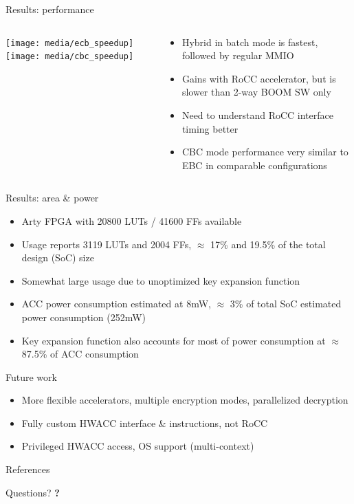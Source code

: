 \documentclass[dvipsnames]{beamer}
\begin{document}
\begin{frame}{Results: performance}
  \begin{columns}[T]
  \begin{column}{0.5\textwidth}
  \texttt{[image: media/ecb\_speedup]}
  \texttt{[image: media/cbc\_speedup]}
  \end{column}
  \begin{column}{0.5\textwidth}
  \begin{itemize}
    \item Hybrid in batch mode is fastest, followed by regular MMIO
    \item Gains with RoCC accelerator, but is slower than 2-way BOOM SW only
    \item Need to understand RoCC interface timing better
    \item CBC mode performance very similar to EBC in comparable configurations
  \end{itemize}
  \end{column}
  \end{columns}
\end{frame}

\begin{frame}{Results: area \& power}
  \begin{itemize}
  \item Arty FPGA with 20800 LUTs / 41600 FFs available
  \item Usage reports 3119 LUTs and 2004 FFs, $\approx$ 17\% and 19.5\% of the
    total design (SoC) size
  \item Somewhat large usage due to unoptimized key expansion function
  \item ACC power consumption estimated at 8mW, $\approx$ 3\% of total SoC
    estimated power consumption (252mW)
  \item Key expansion function also accounts for most of power consumption at
    $\approx$ 87.5\% of ACC consumption
  \end{itemize}
\end{frame}

\begin{frame}{Future work}
  \begin{itemize}
  \item More flexible accelerators, multiple encryption modes, parallelized decryption
  \item Fully custom HWACC interface \& instructions, not RoCC
  \item Privileged HWACC access, OS support (multi-context)
  \end{itemize}
\end{frame}

\begin{frame}[allowframebreaks]{References}
  \tiny
  \nocite{*}
  
  
\end{frame}

\begin{frame}{Questions?}
  \centering
  \huge\bfseries ?
\end{frame}
\end{document}
